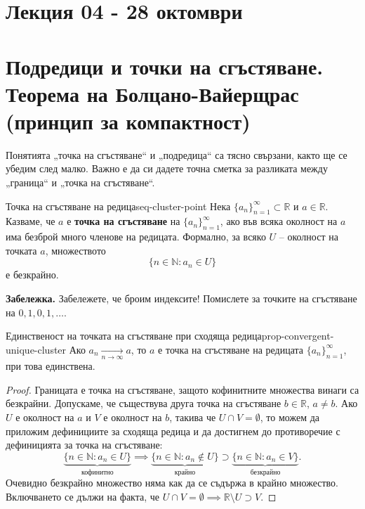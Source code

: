 \section*{Лекция 04 - 28 октомври}

\section{Подредици и точки на сгъстяване. Теорема на Болцано-Вайерщрас (принцип за компактност)}

Понятията „точка на сгъстяване“ и „подредица“ са тясно свързани, както ще се убедим след малко. Важно е да си дадете точна сметка за разликата между „граница“ и „точка на сгъстяване“.

\begin{definition}{Точка на сгъстяване на редица}{seq-cluster-point}
Нека $\{a_n\}_{n=1}^{\infty} \subset \mathbb{R}$ и $a \in \mathbb{R}$. Казваме, че $a$ е \textbf{точка на сгъстяване} на $\{a_n\}_{n=1}^{\infty}$, ако във всяка околност на $a$ има безброй много членове на редицата. Формално, за всяко $U$ -- околност на точката $a$, множеството
\[
\{n \in \mathbb{N} : a_n \in U\}
\]
е безкрайно.
\end{definition}

\noindent\textbf{Забележка.} Забележете, че броим индексите! Помислете за точките на сгъстяване на $0, 1, 0, 1, \dots$.

\begin{theorem}{Единственост на точката на сгъстяване при сходяща редица}{prop-convergent-unique-cluster}
Ако $a_n \xrightarrow[n\to\infty]{} a$, то $a$ е точка на сгъстяване на редицата $\{a_n\}_{n=1}^{\infty}$, при това единствена.
\end{theorem}

\begin{proof}
Границата е точка на сгъстяване, защото кофинитните множества винаги са безкрайни. Допускаме, че съществува друга точка на сгъстяване $b \in \mathbb{R}$, $a \ne b$. Ако $U$ е околност на $a$ и $V$ е околност на $b$, такива че $U \cap V = \emptyset$, то можем да приложим дефинициите за сходяща редица и да достигнем до противоречие с дефиницията за точка на сгъстяване:
\[
\underbrace{\{n \in \mathbb{N} : a_n \in U\}}_{\text{кофинитно}} \implies \underbrace{\{n \in \mathbb{N} : a_n \notin U\}}_{\text{крайно}} \supset \underbrace{\{n \in \mathbb{N} : a_n \in V\}}_{\text{безкрайно}}.
\]
Очевидно безкрайно множество няма как да се съдържа в крайно множество. Включването се дължи на факта, че $U \cap V = \emptyset \implies \mathbb{R} \setminus U \supset V$.
\end{proof}

